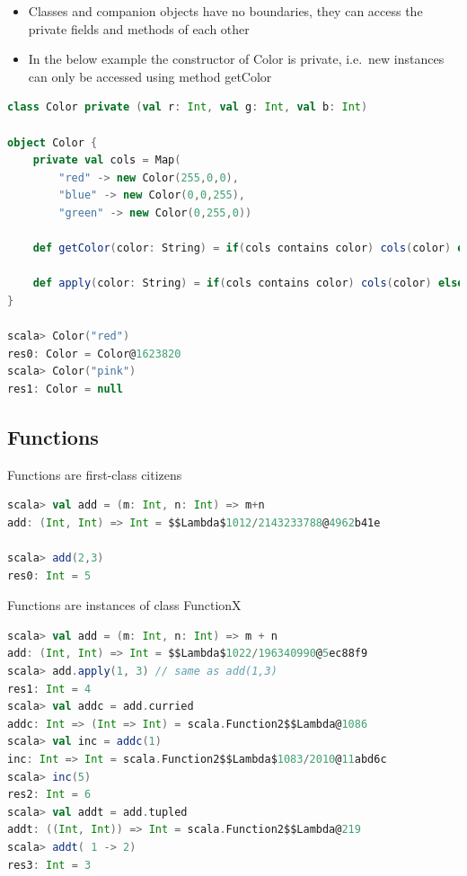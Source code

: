 \begin{itemize}
\tightlist
\item
  Classes and companion objects have no boundaries, they can access the
  private fields and methods of each other
\item
  In the below example the constructor of Color is private, i.e.~new
  instances can only be accessed using method getColor
\end{itemize}

\begin{lstlisting}[language=scala]
class Color private (val r: Int, val g: Int, val b: Int)

object Color {
    private val cols = Map(
        "red" -> new Color(255,0,0),
        "blue" -> new Color(0,0,255),
        "green" -> new Color(0,255,0))

    def getColor(color: String) = if(cols contains color) cols(color) else null

    def apply(color: String) = if(cols contains color) cols(color) else null
}

scala> Color("red")
res0: Color = Color@1623820
scala> Color("pink")
res1: Color = null
\end{lstlisting}

\clearpage
\hypertarget{functions}{%
\subsection{Functions}\label{functions}}

Functions are first-class citizens

\begin{lstlisting}[language=scala,mathescape=false]
scala> val add = (m: Int, n: Int) => m+n
add: (Int, Int) => Int = $$Lambda$1012/2143233788@4962b41e

scala> add(2,3)
res0: Int = 5
\end{lstlisting}

Functions are instances of class FunctionX

\begin{lstlisting}[language=scala,mathescape=false]
scala> val add = (m: Int, n: Int) => m + n
add: (Int, Int) => Int = $$Lambda$1022/196340990@5ec88f9
scala> add.apply(1, 3) // same as add(1,3)
res1: Int = 4
scala> val addc = add.curried
addc: Int => (Int => Int) = scala.Function2$$Lambda@1086
scala> val inc = addc(1)
inc: Int => Int = scala.Function2$$Lambda$1083/2010@11abd6c
scala> inc(5)
res2: Int = 6
scala> val addt = add.tupled
addt: ((Int, Int)) => Int = scala.Function2$$Lambda@219
scala> addt( 1 -> 2)
res3: Int = 3
\end{lstlisting}


